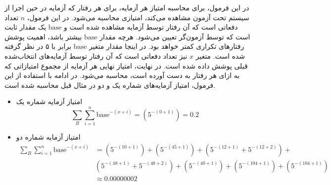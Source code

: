 \begin{itemize}
در این فرمول، برای محاسبه امتیاز هر آزمایه، برای هر رفتار  که آزمایه در حین اجرا از سیستم تحت آزمون مشاهده می‌کند، امتیازی محاسبه می‌شود. در این فرمول، \( n \) تعداد دفعاتی است که آن رفتار توسط آزمایه مشاهده شده است و \( \text{base} \) یک مقدار ثابت است که توسط آزمون‌گر تعیین می‌شود. هرچه مقدار \( \text{base} \) بیشتر باشد، اهمیت پوشش رفتارهای تکراری کمتر خواهد بود. در اینجا مقدار متغیر \( \text{base} \) برابر با ۵ در نظر گرفته شده است. متغیر \( x \) نیز تعداد دفعاتی است که آن رفتار توسط آزمایه‌های انتخاب‌شده قبلی پوشش داده شده است. در نهایت، امتیاز نهایی هر آزمایه از مجموع امتیازاتی که به ازای هر رفتار به دست آورده است، محاسبه می‌شود. در ادامه با استفاده از این فرمول، امتیاز آزمایه‌های شماره یک و دو در مثال قبل محاسبه شده است.

\begin{itemize}
	\item امتیاز آزمایه شماره یک
	\[ \sum_{B} \sum_{i=1}^{n} \text{base}^{-(x+i)} = (5^{-(0+1)}) = 0.2 \]
	\item امتیاز آزمایه شماره دو
	\begin{align*}
		\sum_{B} \sum_{i=1}^{n} \text{base}^{-(x+i)} & = (5^{-(10+1)}) + (5^{-(45+1)}) + (5^{-(12+1)} + 5^{-(12+2)})  + \\
		& (5^{-(48+1)} + 5^{-(48+2)}) + (5^{-(40+1)}) + (5^{-(104+1)}) + (5^{-(104+1)}) \\
		& \approx 0.00000002
	\end{align*}
\end{itemize}

\end{itemize}
